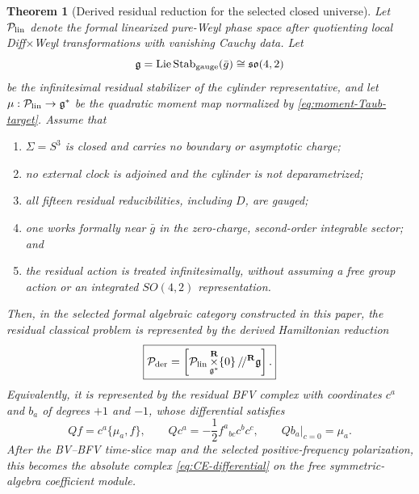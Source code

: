 \documentclass[11pt]{article}
\newtheorem{theorem}{Theorem}[section]
\theoremstyle{definition}
\theoremstyle{remark}
\newcommand{\g}{\mathfrak g}
\begin{document}
\begin{theorem}[Derived residual reduction for the selected closed universe]
\label{thm:derived-residual-reduction}
Let $\mathcal P_{\rm lin}$ denote the formal linearized pure-Weyl phase
space after quotienting local Diff$\times$Weyl transformations with
vanishing Cauchy data.  Let
\begin{equation}
 \g=\operatorname{Lie}\operatorname{Stab}_{\rm gauge}(\bar g)
   \cong\mathfrak{so}(4,2)
\end{equation}
be the infinitesimal residual stabilizer of the cylinder representative,
and let $\mu:\mathcal P_{\rm lin}\to\g^*$ be the quadratic moment map
normalized by \eqref{eq:moment-Taub-target}.  Assume that
\begin{enumerate}
\item $\Sigma=S^3$ is closed and carries no boundary or asymptotic charge;
\item no external clock is adjoined and the cylinder is not deparametrized;
\item all fifteen residual reducibilities, including $D$, are gauged;
\item one works formally near $\bar g$ in the zero-charge, second-order
integrable sector; and
\item the residual action is treated infinitesimally, without assuming a
free group action or an integrated $SO(4,2)$ representation.
\end{enumerate}
Then, in the selected formal algebraic category constructed in this paper,
the residual classical problem is represented by the derived Hamiltonian
reduction
\begin{equation}\label{eq:derived-residual-reduction}
 \boxed{
 \mathcal P_{\rm der}
 =\left[\mathcal P_{\rm lin}
   \mathop{\times}^{\mathbf R}_{\g^*}\{0\}\,/\!/^{\mathbf R}\g\right].}
\end{equation}
Equivalently, it is represented by the residual BFV complex with coordinates
$c^a$ and $b_a$ of degrees $+1$ and $-1$, whose differential satisfies
\begin{equation}\label{eq:derived-residual-BFV}
 Qf=c^a\{\mu_a,f\},\qquad
 Qc^a=-\frac12f^a{}_{bc}c^bc^c,\qquad
 Qb_a\big|_{c=0}=\mu_a.
\end{equation}
After the BV--BFV time-slice map and the selected positive-frequency
polarization, this becomes the absolute complex
\eqref{eq:CE-differential} on the free symmetric-algebra coefficient module.
\end{theorem}
\end{document}

